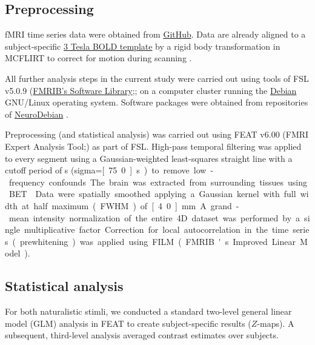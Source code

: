 \documentclass[english]{article}
\begin{document}
\subsection{Preprocessing}
fMRI time series data were obtained from
\href{https://github.com/psychoinformatics-de/studyforrest-data-aligned}{GitHub}.
Data are already aligned to a subject-specific \href{https://github.com/psychoinformatics-de/studyforrest-data-templatetransforms}{3 Tesla BOLD template} by a rigid body transformation in MCFLIRT \citep{jenkinson2002registration} to correct for motion during scanning
\citep{sengupta2016extension}.

All further analysis steps in the current study were carried out using tools of FSL v5.0.9 (\href{https://www.fmrib.ox.ac.uk/fsl}{FMRIB's Software Library};\citep{smith2004fsl}; on a computer cluster running the \href{https://www.debian.org}{Debian} GNU/Linux operating system.
Software packages were obtained from repositories of \href{http://neuro.debian.net}{NeuroDebian} \citep{halchenko2012open}.

Preprocessing (and statistical analysis) was carried out using FEAT v6.00 (FMRI Expert Analysis Tool;\citep{woolrich2001autocorr}) as part of FSL.
High-pass temporal filtering was applied to every segment using a Gaussian-weighted least-squares straight line with a cutoff period of \unit[150]{s} (sigma=\unit[75.0]{s}) to remove low-frequency confounds.
The brain was extracted from surrounding tissues using BET \citep{smith2002bet}.
Data were spatially smoothed applying a Gaussian kernel with full width at half maximum (FWHM) of \unit[4.0]{mm}.
A grand-mean intensity normalization of the entire 4D dataset was performed by a single multiplicative factor.
Correction for local autocorrelation in the time series (prewhitening) was applied using FILM (FMRIB's Improved Linear Model).

\subsection{Statistical analysis}
For both naturalistic stimli, we conducted a standard two-level general linear model (GLM) analysis in FEAT to create subject-specific results ($Z$-maps). A subsequent, third-level analysis averaged contrast estimates over subjects.
\end{document}
